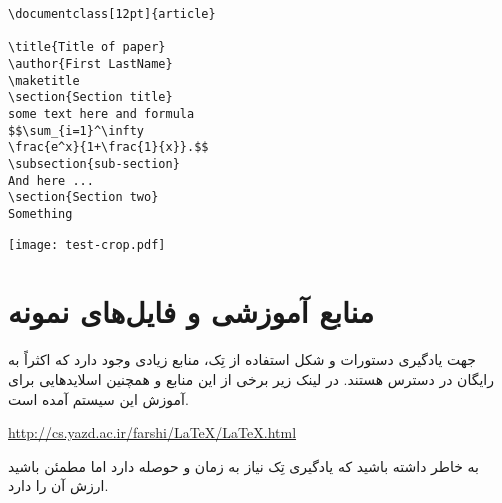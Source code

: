  \begin{minipage}{0.4\textwidth}
 \latin \small
 \begin{verbatim}
\documentclass[12pt]{article}

\title{Title of paper}
\author{First LastName}
\maketitle
\section{Section title}
some text here and formula 
$$\sum_{i=1}^\infty 
\frac{e^x}{1+\frac{1}{x}}.$$
\subsection{sub-section}
And here ...
\section{Section two}
Something

 \end{verbatim}
 \end{minipage}
 \begin{minipage}{0.6\textwidth}
 \texttt{[image: test-crop.pdf]}
 \end{minipage}
 
\section{منابع آموزشی و فایل‌های نمونه}
جهت یادگیری دستورات و شکل استفاده از تِک، منابع زیادی وجود دارد که اکثراً به رایگان
در دسترس هستند. در لینک زیر برخی از این منابع و همچنین اسلایدهایی برای آموزش این 
سیستم آمده است.

\centerline{\centering \url{http://cs.yazd.ac.ir/farshi/LaTeX/LaTeX.html}}

به خاطر داشته باشید که یادگیری تِک نیاز به زمان و حوصله دارد اما مطمئن باشید ارزش آن را دارد.
